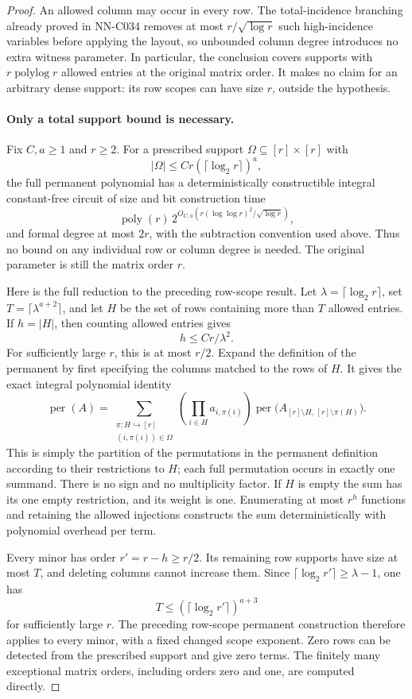 \begin{proof}
An allowed column may occur in every row.  The total-incidence
branching already proved in NN-C034 removes at most
$r/\sqrt{\log r}$ such high-incidence variables before applying
the layout, so unbounded column degree introduces no extra witness
parameter.  In particular, the conclusion covers supports with
$r\operatorname{polylog} r$ allowed entries at the original matrix
order.  It makes no claim for an arbitrary dense support: its
row scopes can have size $r$, outside the hypothesis.

\paragraph{Only a total support bound is necessary.}
Fix $C,a\ge1$ and $r\ge2$.  For a prescribed support
$\Omega\subseteq[r]\times[r]$ with
\[
                     |\Omega|\le Cr(\lceil\log_2r\rceil)^a,
\]
the full permanent polynomial has a deterministically
constructible integral constant-free circuit of size and
bit construction time
\[
 \operatorname{poly}(r)\,
       2^{O_{C,a}(r(\log\log r)^2/\sqrt{\log r})},
\]
and formal degree at most $2r$, with the subtraction convention
used above.  Thus no bound on any individual row or column
degree is needed.  The original parameter is still the
matrix order $r$.

Here is the full reduction to the preceding row-scope result.
Let $\lambda=\lceil\log_2r\rceil$, set
$T=\lceil\lambda^{a+2}\rceil$, and let $H$ be the set of
rows containing more than $T$ allowed entries.  If $h=|H|$,
then counting allowed entries gives
\[
                          h\le Cr/\lambda^2.
\]
For sufficiently large $r$, this is at most $r/2$.
Expand the definition of the permanent by first specifying
the columns matched to the rows of $H$.  It gives the exact
integral polynomial identity
\[
 \operatorname{per}(A)=
 \sum_{\substack{\pi:H\hookrightarrow[r]\\(i,\pi(i))\in\Omega}}
       \left(\prod_{i\in H}a_{i,\pi(i)}\right)
       \operatorname{per}\bigl(A_{[r]\setminus H,\,[r]\setminus\pi(H)}\bigr).
\]
This is simply the partition of the permutations in the
permanent definition according to their restrictions to
$H$; each full permutation occurs in exactly one summand.
There is no sign and no multiplicity factor.  If $H$ is
empty the sum has its one empty restriction, and its
weight is one.  Enumerating at most $r^h$ functions and
retaining the allowed injections constructs the sum
deterministically with polynomial overhead per term.

Every minor has order $r'=r-h\ge r/2$.  Its remaining
row supports have size at most $T$, and deleting columns
cannot increase them.  Since
$\lceil\log_2r'\rceil\ge\lambda-1$, one has
\[
                   T\le(\lceil\log_2r'\rceil)^{a+3}
\]
for sufficiently large $r$.  The preceding row-scope
permanent construction therefore applies to every minor,
with a fixed changed scope exponent.  Zero rows can be
detected from the prescribed support and give zero terms.
The finitely many exceptional matrix orders, including
orders zero and one, are computed directly.


\end{proof}
